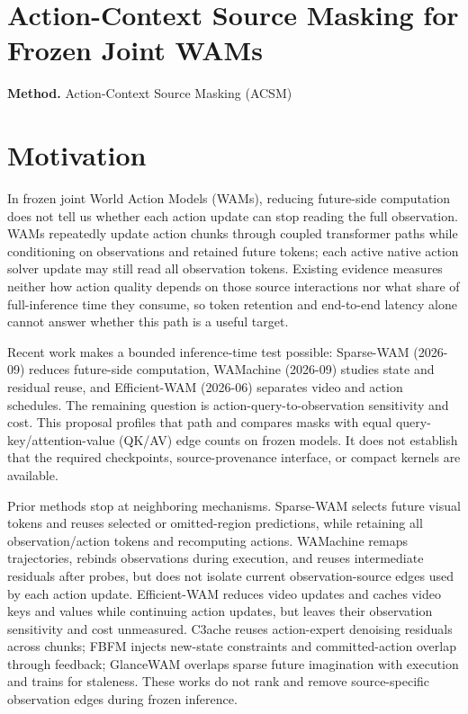 \documentclass[10pt,a4paper]{article}
\begin{document}
\section*{Action-Context Source Masking for Frozen Joint WAMs}
\textbf{Method.} Action-Context Source Masking (ACSM)
\section*{Motivation}
In frozen joint World Action Models (WAMs), reducing future-side computation does not tell us whether each action update can stop reading the full observation. WAMs repeatedly update action chunks through coupled transformer paths while conditioning on observations and retained future tokens;\allowbreak{} each active native action solver update may still read all observation tokens. Existing evidence measures neither how action quality depends on those source interactions nor what share of full-inference time they consume, so token retention and end-to-end latency alone cannot answer whether this path is a useful target.

Recent work makes a bounded inference-time test possible: Sparse-WAM (2026-09) reduces future-side computation, WAMachine (2026-09) studies state and residual reuse, and Efficient-WAM (2026-06) separates video and action schedules. The remaining question is action-query-to-observation sensitivity and cost. This proposal profiles that path and compares masks with equal query-key/attention-value (QK/AV) edge counts on frozen models. It does not establish that the required checkpoints, source-provenance interface, or compact kernels are available.

Prior methods stop at neighboring mechanisms. Sparse-WAM selects future visual tokens and reuses selected or omitted-region predictions, while retaining all observation/action tokens and recomputing actions. WAMachine remaps trajectories, rebinds observations during execution, and reuses intermediate residuals after probes, but does not isolate current observation-source edges used by each action update. Efficient-WAM reduces video updates and caches video keys and values while continuing action updates, but leaves their observation sensitivity and cost unmeasured. C3ache reuses action-expert denoising residuals across chunks;\allowbreak{} FBFM injects new-state constraints and committed-action overlap through feedback;\allowbreak{} GlanceWAM overlaps sparse future imagination with execution and trains for staleness. These works do not rank and remove source-specific observation edges during frozen inference.
\end{document}
